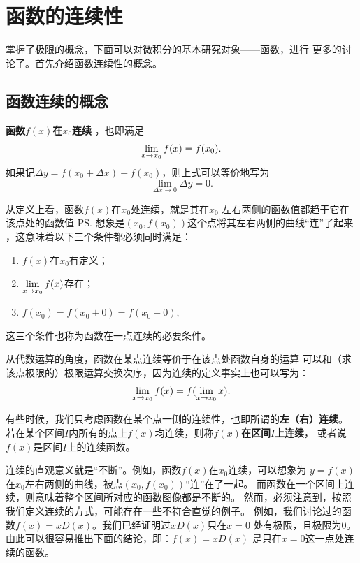 \newpage
\section{函数的连续性}

掌握了极限的概念，下面可以对微积分的基本研究对象——函数，进行
更多的讨论了。首先介绍函数连续性的概念。

\subsection{函数连续的概念}

\begin{thx}
{\bf 函数$f(x)$在$x_0$连续}
，也即满足
	$$\lim\limits_{x\to{x_0}}f(x)=f(x_0).$$
	如果记$\Delta y=f(x_0+\Delta x)-f(x_0)$，则上式可以等价地写为
	$$\lim\limits_{\Delta x\to 0}\Delta y=0.$$
\end{thx}

从定义上看，函数$f(x)$在$x_0$处连续，就是其在$x_0$
左右两侧的函数值都趋于它在该点处的函数值
\ps{想象是$(x_0,f(x_0))$这个点将其左右两侧的曲线“连”了起来}
，这意味着以下三个条件都必须同时满足：
\begin{enumerate}[(1)]
	\setlength{\itemindent}{1cm}
	\item $f(x)$在$x_0$有定义； 
	\item $\lim\limits_{x\to{x_0}}f(x)$存在； 
	\item $f(x_0)=f(x_0+0)=f(x_0-0)$,
\end{enumerate}
这三个条件也称为函数在一点连续的必要条件。

\bs
从代数运算的角度，函数在某点连续等价于在该点处函数自身的运算
可以和（求该点极限的）极限运算交换次序，因为连续的定义事实上也可以写为：
$$\lim\limits_{x\to{x_0}}f(x)=f(\lim\limits_{x\to{x_0}}x).$$

\bs
有些时候，我们只考虑函数在某个点一侧的连续性，也即所谓的{\bf 左（右）连续}。
若在某个区间$I$内所有的点上$f(x)$均连续，则称{\bf $f(x)$在区间$I$上连续}，
或者说{$f(x)$是区间$I$上的连续函数}。

\bs
连续的直观意义就是“不断”。例如，函数$f(x)$在$x_0$连续，可以想象为
$y=f(x)$在$x_0$左右两侧的曲线，被点$(x_0,f(x_0))$“连”在了一起。
而函数在一个区间上连续，则意味着整个区间所对应的函数图像都是不断的。
然而，必须注意到，按照我们定义连续的方式，可能存在一些不符合直觉的例子。
例如，我们讨论过的函数$f(x)=xD(x)$。我们已经证明过$xD(x)$只在$x=0$
处有极限，且极限为$0$。由此可以很容易推出下面的结论，即：$f(x)=xD(x)$
是只在$x=0$这一点处连续的函数。


